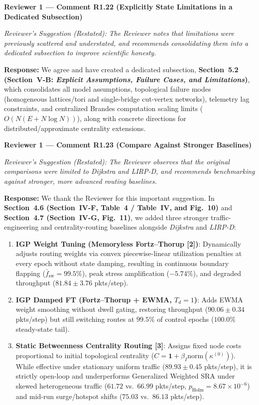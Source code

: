 \documentclass[11pt,a4paper]{article}
\newcommand{\cbox}[2]{%
  \vspace{0.6em}\noindent\textbf{#1}\par\smallskip
  \noindent\textit{Reviewer's Suggestion (Restated):} \textit{#2}\par\smallskip
}
\begin{document}
\cbox{Reviewer 1 --- Comment R1.22 (Explicitly State Limitations in a Dedicated Subsection)}{The Reviewer notes that limitations were previously scattered and understated, and recommends consolidating them into a dedicated subsection to improve scientific honesty.}

\noindent\textbf{Response:} We agree and have created a dedicated subsection, \textbf{Section~5.2 (Section~V-B: \textit{Explicit Assumptions, Failure Cases, and Limitations})}, which consolidates all model assumptions, topological failure modes (homogeneous lattices/tori and single-bridge cut-vertex networks), telemetry lag constraints, and centralized Brandes computation scaling limits ($O(N(E+N\log N))$), along with concrete directions for distributed/approximate centrality extensions.

\hrulefill

\cbox{Reviewer 1 --- Comment R1.23 (Compare Against Stronger Baselines)}{The Reviewer observes that the original comparisons were limited to Dijkstra and LIRP-D, and recommends benchmarking against stronger, more advanced routing baselines.}

\noindent\textbf{Response:} We thank the Reviewer for this important suggestion. In \textbf{Section~4.6 (Section~IV-F, Table~4 / Table~IV, and Fig.~10)} and \textbf{Section~4.7 (Section~IV-G, Fig.~11)}, we added three stronger traffic-engineering and centrality-routing baselines alongside \textit{Dijkstra} and \textit{LIRP-D}:
\begin{enumerate}[leftmargin=1.8em]
    \item \textbf{IGP Weight Tuning (Memoryless Fortz--Thorup [2])}: Dynamically adjusts routing weights via convex piecewise-linear utilization penalties at every epoch without state damping, resulting in continuous boundary flapping ($\bar{f}_{\text{sw}} = 99.5\%$), peak stress amplification ($-5.74\%$), and degraded throughput ($81.84 \pm 3.76$ pkts/step).
    \item \textbf{IGP Damped FT (Fortz--Thorup + EWMA, $T_d=1$)}: Adds EWMA weight smoothing without dwell gating, restoring throughput ($90.06 \pm 0.34$ pkts/step) but still switching routes at $99.5\%$ of control epochs ($100.0\%$ steady-state tail).
    \item \textbf{Static Betweenness Centrality Routing [3]}: Assigns fixed node costs proportional to initial topological centrality ($C = \mathbf{1} + \beta_I\mathrm{norm}(\kappa^{(0)})$). While effective under stationary uniform traffic ($89.93 \pm 0.45$ pkts/step), it is strictly open-loop and underperforms Generalized Weighted SRA under skewed heterogeneous traffic ($61.72$ vs.\ $66.99$ pkts/step, $p_{\text{Holm}}=8.67\times 10^{-6}$) and mid-run surge/hotspot shifts ($75.03$ vs.\ $86.13$ pkts/step).
\end{enumerate}
\end{document}
